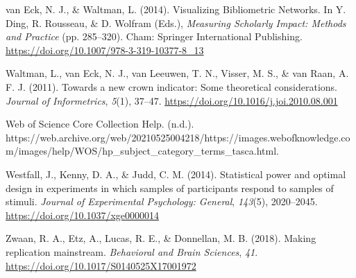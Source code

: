 \documentclass[
  english,
  man,floatsintext]{apa6}
\newlength{\cslhangindent}
\newlength{\cslentryspacingunit} %
\newenvironment{CSLReferences}[2] %
 {%
  \setlength{\parindent}{0pt}
  \ifodd #1
  \let\oldpar\par
  \def\par{\hangindent=\cslhangindent\oldpar}
  \fi
  \setlength{\parskip}{#2\cslentryspacingunit}
 }%
 {}
\begin{document}
\begin{CSLReferences}{1}{0}
\leavevmode{}%
van Eck, N. J., \& Waltman, L. (2014). Visualizing {Bibliometric Networks}. In Y. Ding, R. Rousseau, \& D. Wolfram (Eds.), \emph{Measuring {Scholarly Impact}: {Methods} and {Practice}} (pp. 285--320). {Cham}: {Springer International Publishing}. \url{https://doi.org/10.1007/978-3-319-10377-8_13}

\leavevmode{}%
Waltman, L., van Eck, N. J., van Leeuwen, T. N., Visser, M. S., \& van Raan, A. F. J. (2011). Towards a new crown indicator: {Some} theoretical considerations. \emph{Journal of Informetrics}, \emph{5}(1), 37--47. \url{https://doi.org/10.1016/j.joi.2010.08.001}

\leavevmode{}%
Web of {Science Core Collection Help}. (n.d.). https://web.archive.org/web/20210525004218/https://images.webofknowledge.com/images/help/WOS/hp\_subject\_category\_terms\_tasca.html.

\leavevmode{}%
Westfall, J., Kenny, D. A., \& Judd, C. M. (2014). Statistical power and optimal design in experiments in which samples of participants respond to samples of stimuli. \emph{Journal of Experimental Psychology: General}, \emph{143}(5), 2020--2045. \url{https://doi.org/10.1037/xge0000014}

\leavevmode{}%
Zwaan, R. A., Etz, A., Lucas, R. E., \& Donnellan, M. B. (2018). Making replication mainstream. \emph{Behavioral and Brain Sciences}, \emph{41}. \url{https://doi.org/10.1017/S0140525X17001972}

\end{CSLReferences}
\end{document}
